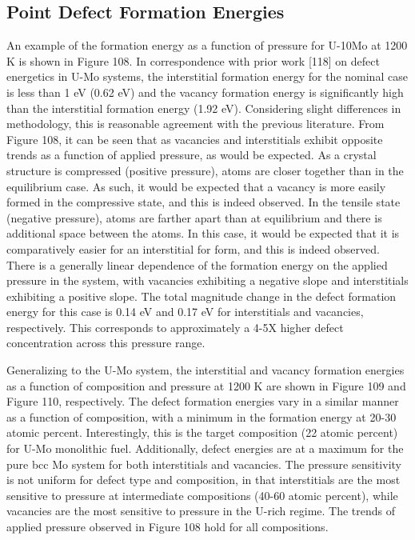 \documentclass[11pt, oneside]{elsarticle}
\begin{document}
\subsection{Point Defect Formation Energies}
An example of the formation energy as a function of pressure for U-10Mo at 1200 K is shown in Figure 108. In correspondence with prior work [118] on defect energetics in U-Mo systems, the interstitial formation energy for the nominal case is less than 1 eV (0.62 eV) and the vacancy formation energy is significantly high than the interstitial formation energy (1.92 eV). Considering slight differences in methodology, this is reasonable agreement with the previous literature. From Figure 108, it can be seen that as vacancies and interstitials exhibit opposite trends as a function of applied pressure, as would be expected. As a crystal structure is compressed (positive pressure), atoms are closer together than in the equilibrium case. As such, it would be expected that a vacancy is more easily formed in the compressive state, and this is indeed observed. In the tensile state (negative pressure), atoms are farther apart than at equilibrium and there is additional space between the atoms. In this case, it would be expected that it is comparatively easier for an interstitial for form, and this is indeed observed. There is a generally linear dependence of the formation energy on the applied pressure in the system, with vacancies exhibiting a negative slope and interstitials exhibiting a positive slope. The total magnitude change in the defect formation energy for this case is 0.14 eV and 0.17 eV for interstitials and vacancies, respectively. This corresponds to approximately a 4-5X higher defect concentration across this pressure range. 

Generalizing to the U-Mo system, the interstitial and vacancy formation energies as a function of composition and pressure at 1200 K are shown in Figure 109 and Figure 110, respectively. The defect formation energies vary in a similar manner as a function of composition, with a minimum in the formation energy at 20-30 atomic percent. Interestingly, this is the target composition (22 atomic percent) for U-Mo monolithic fuel. Additionally, defect energies are at a maximum for the pure bcc Mo system for both interstitials and vacancies. The pressure sensitivity is not uniform for defect type and composition, in that interstitials are the most sensitive to pressure at intermediate compositions (40-60 atomic percent), while vacancies are the most sensitive to pressure in the U-rich regime. The trends of applied pressure observed in Figure 108 hold for all compositions. 
\end{document}
